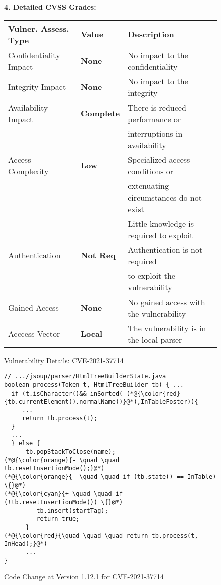 \begin{figure}[t]
\begin{flushleft}
{\bf 4. Detailed CVSS Grades:}\\
\end{flushleft}
  \centering
  \tabcolsep 3pt
  \footnotesize
  \begin{tabular}{lll}
   Vulner. Assess. Type   & Value & Description \\
      \hline
    Confidentiality Impact & {\bf None}  & No impact to the confidentiality \\
    Integrity Impact & {\bf None}  & No impact to the integrity \\
    Availability Impact & {\bf Complete} & There is reduced performance or\\
    & & interruptions in availability\\
    Access Complexity & {\bf Low} & Specialized access conditions or \\
    & & extenuating circumstances do not exist\\
    & & Little knowledge is required to exploit\\
    Authentication & {\bf Not Req} & Authentication is not required \\
    & & to exploit the vulnerability\\
    Gained Access & {\bf None}  & No gained access with the vulnerability \\
    Acccess Vector & {\bf Local} & The vulnerability is in the local parser \\
    \end{tabular}%
  \label{CVSS:tab}%
\caption{Vulnerability Details: CVE-2021-37714}
\label{CVSS-tab}
\end{figure}

\begin{figure}[t]
	\centering
	\begin{lstlisting}[]
// .../jsoup/parser/HtmlTreeBuilderState.java
boolean process(Token t, HtmlTreeBuilder tb) { ...
  if (t.isCharacter()&& inSorted( (*@{\color{red}{tb.currentElement().normalName()}@*),InTableFoster)){
     ...
     return tb.process(t);
  }
  ...
  } else {
      tb.popStackToClose(name);
(*@{\color{orange}{- \quad \quad tb.resetInsertionMode();}@*)
(*@{\color{orange}{- \quad \quad if (tb.state() == InTable) \{}@*)
(*@{\color{cyan}{+ \quad \quad if (!tb.resetInsertionMode()) \{}@*)
         tb.insert(startTag);
         return true;
      }
(*@{\color{red}{\quad \quad \quad return tb.process(t, InHead);}@*)
      ...
}
	\end{lstlisting}
        \vspace{-15pt}
        \caption{Code Change at Version 1.12.1 for CVE-2021-37714}
        \vspace{-6pt}
        \label{fig:motiv-code}
\end{figure}

